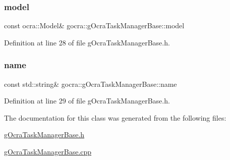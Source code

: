 \hypertarget{classgocra_1_1gOcraTaskManagerBase_adc439e7170f7120611fc6d009d06404e}{}\label{classgocra_1_1gOcraTaskManagerBase_adc439e7170f7120611fc6d009d06404e} 
\subsubsection{\texorpdfstring{model}{model}}
{\footnotesize\ttfamily const ocra\+::\+Model\& gocra\+::g\+Ocra\+Task\+Manager\+Base\+::model\hspace{0.3cm}{\ttfamily [protected]}}



Definition at line 28 of file g\+Ocra\+Task\+Manager\+Base.\+h.

\hypertarget{classgocra_1_1gOcraTaskManagerBase_adfda0d31ecfa9afea1380f076a472f37}{}\label{classgocra_1_1gOcraTaskManagerBase_adfda0d31ecfa9afea1380f076a472f37} 
\subsubsection{\texorpdfstring{name}{name}}
{\footnotesize\ttfamily const std\+::string\& gocra\+::g\+Ocra\+Task\+Manager\+Base\+::name\hspace{0.3cm}{\ttfamily [protected]}}



Definition at line 29 of file g\+Ocra\+Task\+Manager\+Base.\+h.



The documentation for this class was generated from the following files\+:\begin{DoxyCompactItemize}
\item 
\hyperlink{gOcraTaskManagerBase_8h}{g\+Ocra\+Task\+Manager\+Base.\+h}\item 
\hyperlink{gOcraTaskManagerBase_8cpp}{g\+Ocra\+Task\+Manager\+Base.\+cpp}\end{DoxyCompactItemize}
